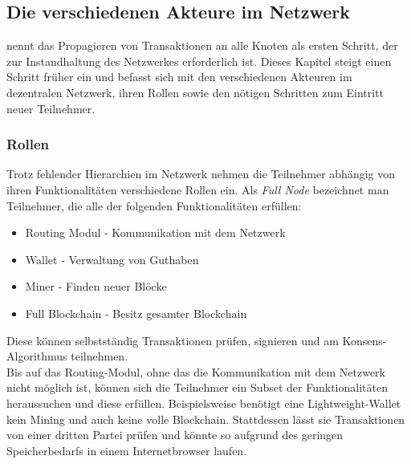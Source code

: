 \subsection{Die verschiedenen Akteure im Netzwerk}
\cite{nakamoto_whitepaper_2008} nennt das Propagieren von Transaktionen an alle Knoten als ersten Schritt, der zur Instandhaltung des Netzwerkes erforderlich ist. Dieses Kapitel steigt einen Schritt früher ein und befasst sich mit den verschiedenen Akteuren im dezentralen Netzwerk, ihren Rollen sowie den nötigen Schritten zum Eintritt neuer Teilnehmer.
\subsubsection{Rollen}
Trotz fehlender Hierarchien im Netzwerk nehmen die Teilnehmer abhängig von ihren Funktionalitäten verschiedene Rollen ein. Als \emph{Full Node} bezeichnet man Teilnehmer, die alle der folgenden Funktionalitäten erfüllen:
\begin{itemize}
	\item Routing Modul - Kommunikation mit dem Netzwerk
	\item Wallet - Verwaltung von Guthaben
	\item Miner - Finden neuer Blöcke
	\item Full Blockchain - Besitz gesamter Blockchain
\end{itemize}
Diese können selbstständig Transaktionen prüfen, signieren und am Konsens-Algorithmus teilnehmen.\\

Bis auf das Routing-Modul, ohne das die Kommunikation mit dem Netzwerk nicht möglich ist, können sich die Teilnehmer ein Subset der Funktionalitäten heraussuchen und diese erfüllen. 
Beispielsweise benötigt eine Lightweight-Wallet kein Mining und auch keine volle Blockchain. 
Stattdessen lässt sie Transaktionen von einer dritten Partei prüfen und könnte so aufgrund des geringen Speicherbedarfs in einem Internetbrowser laufen.

